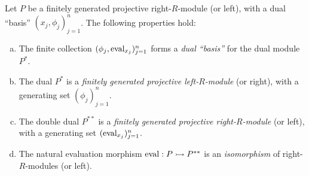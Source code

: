 \begin{proposition}
\label{prop:properties-of-fg-proj-modules-and-duals}
Let \(P\) be a finitely generated projective right-\(R\)-module (or left), with
a dual ``basis'' \((x_j, \phi_j)_{j=1}^n\). The following properties hold:
\begin{enumerate}[(a)]\setlength\itemsep{0em}
\item The finite collection \((\phi_j, \operatorname{eval}_{x_j})_{j=1}^n\) forms a \emph{dual
  ``basis''} for the dual module \(P^{*}\).
\item The dual \(P^{*}\) is a \emph{finitely generated projective
    left-\(R\)-module} (or right), with a generating set \((\phi_j)_{j=1}^n\).
\item The double dual \(P^{* *}\) is a \emph{finitely generated projective
    right-\(R\)-module} (or left), with a generating set
  \((\operatorname{eval}_{x_j})_{j=1}^n\).
\item The natural evaluation morphism \(\operatorname{eval}: P \rightarrowtail P^{* *}\) is an
  \emph{isomorphism} of right-\(R\)-modules (or left).
\end{enumerate}
\end{proposition}

